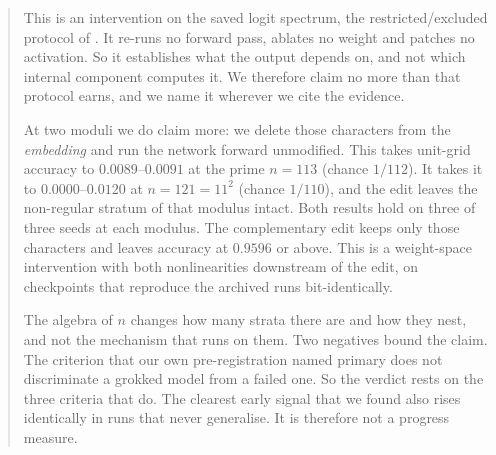 \begin{abstract}
This is an intervention on the saved logit spectrum, the restricted/excluded protocol of
\citet{nanda2023progress}. It re-runs no forward pass, ablates no weight and patches no
activation. So it establishes what the output depends on, and not which internal component
computes it. We therefore claim no more than that protocol earns, and we name it wherever we
cite the evidence.

At two moduli we do claim more: we delete those characters from the \emph{embedding} and run
the network forward unmodified. This takes unit-grid accuracy to $0.0089$--$0.0091$ at the prime
$n = 113$ (chance $1/112$). It takes it to $0.0000$--$0.0120$ at $n = 121 = 11^{2}$ (chance
$1/110$), and the edit leaves the non-regular stratum of that modulus intact. Both results hold
on three of three seeds at each modulus. The complementary edit keeps only those characters and
leaves accuracy at $0.9596$ or above. This is a weight-space intervention with both
nonlinearities downstream of the edit, on checkpoints that reproduce the archived runs
bit-identically.

The algebra of $n$ changes how many strata there are and how they nest, and not the mechanism
that runs on them. Two negatives bound the claim. The criterion that our own pre-registration
named primary does not discriminate a grokked model from a failed one. So the verdict rests on
the three criteria that do. The clearest early signal that we found also rises identically in
runs that never generalise. It is therefore not a progress measure.
\end{abstract}
